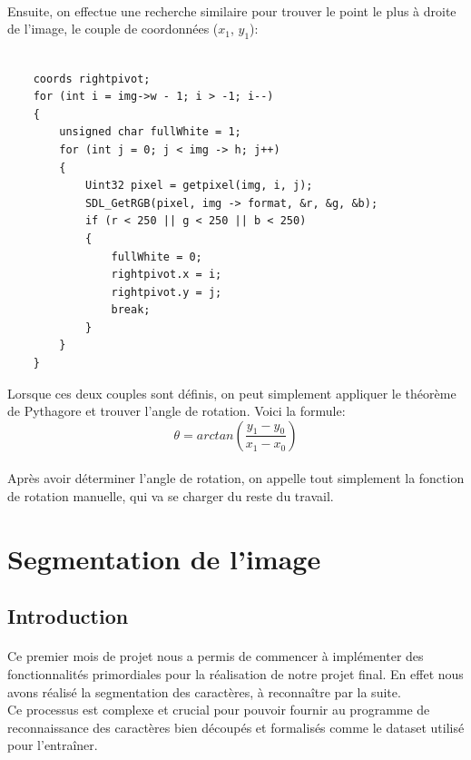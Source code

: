 \documentclass{article}
\begin{document}
\paragraph{}
Ensuite, on effectue une recherche similaire pour trouver le point le plus à droite de l'image, le couple de coordonnées ($x_1$, $y_1$): \\

\begin{lstlisting}

    coords rightpivot;
    for (int i = img->w - 1; i > -1; i--)
    {
        unsigned char fullWhite = 1;
        for (int j = 0; j < img -> h; j++)
        {
            Uint32 pixel = getpixel(img, i, j);
            SDL_GetRGB(pixel, img -> format, &r, &g, &b);
            if (r < 250 || g < 250 || b < 250)
            {
                fullWhite = 0;
                rightpivot.x = i;
                rightpivot.y = j;
                break;
            }
        }
    }
\end{lstlisting}

Lorsque ces deux couples sont définis, on peut simplement appliquer le théorème de Pythagore et trouver l'angle de rotation. Voici la formule: \\

\[
    \theta = arctan(\frac{y_1 - y_0}{x_1 - x_0})
\]

\paragraph{}
Après avoir déterminer l'angle de rotation, on appelle tout simplement la fonction de rotation manuelle, qui va se charger du reste du travail.

\newpage
{}
\section{Segmentation de l'image}
\subsection{Introduction}
    \paragraph{}
    Ce premier mois de projet nous a permis de commencer à implémenter des fonctionnalités primordiales pour la réalisation de notre projet final. En effet nous avons réalisé la segmentation des caractères, à reconnaître par la suite. \\
    Ce processus est complexe et crucial pour pouvoir fournir au programme de reconnaissance des caractères bien découpés et formalisés comme le dataset utilisé pour l'entraîner.
    
\end{document}
